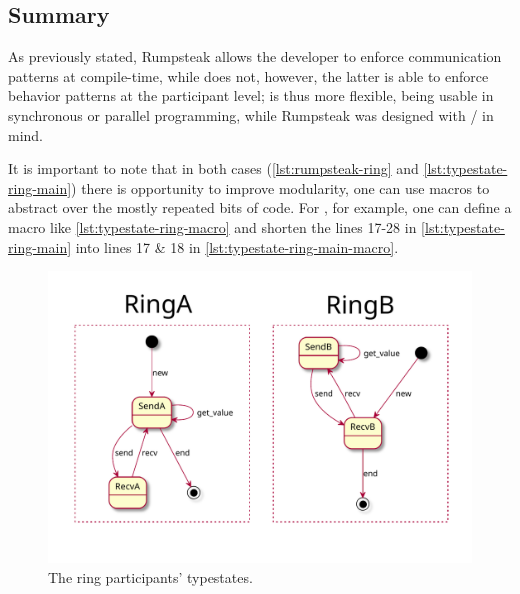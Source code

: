 \subsection{Summary}

As previously stated, Rumpsteak allows the developer to enforce communication patterns at compile-time,
while  does not, however, the latter is able to enforce behavior patterns at the participant level;
 is thus more flexible, being usable in synchronous or parallel programming,
while Rumpsteak was designed with / in mind.

It is important to note that in both cases (\autoref{lst:rumpsteak-ring} and \autoref{lst:typestate-ring-main})
there is opportunity to improve modularity,
one can use macros to abstract over the mostly repeated bits of code.
For , for example, one can define a macro like \autoref{lst:typestate-ring-macro} and
shorten the lines 17-28 in \autoref{lst:typestate-ring-main} into lines 17 \& 18 in \autoref{lst:typestate-ring-main-macro}.


\begin{figure}
    \centering
    \includegraphics[width=\linewidth]{Chapters/Figures/C5/rings.pdf}
    \caption{The ring participants' typestates.}
    \label{fig:ring-typestate}
\end{figure}

